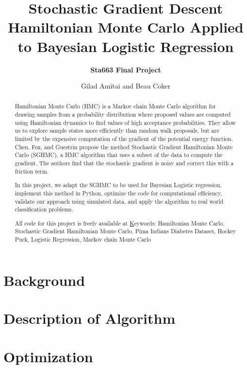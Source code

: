 \documentclass[12pt]{article}
\begin{document}
\vspace{-1in}
\author{\bf Sta663 Final Project}
\title{\bf Stochastic Gradient Descent Hamiltonian Monte Carlo Applied to Bayesian Logistic Regression}
\date{Gilad Amitai and Beau Coker}
\maketitle 


\begin{abstract}
	Hamiltonian Monte Carlo (HMC) is a Markov chain Monte Carlo algorithm for drawing samples from a probability distribution where proposed values are computed using Hamiltonian dynamics to find values of high acceptance probabilities. They allow us to explore sample states more efficiently than random walk proposals, but are limited by the expensive computation of the gradient of the potential energy function. Chen, Fox, and Guestrin propose the method Stochastic Gradient Hamiltonian Monte Carlo (SGHMC), a HMC algorithm that uses a subset of the data to compute the gradient. The authors find that the stochastic gradient is noisy and correct this with a friction term.

	In this project, we adapt the SGHMC to be used for Bayesian Logistic regression, implement this method in Python, optimize the code for computational efficiency, validate our approach using simulated data, and apply the algorithm to real world classification problems.
	
	All code for this project is freely available at \href{https://github.com/gldmt-duke/CokerAmitaiSGHMC}
	
	Keywords: Hamiltonian Monte Carlo, Stochastic Gradient Hamiltonian Monte Carlo, Pima Indians Diabetes Dataset, Hockey Puck, Logistic Regression, Markov chain Monte Carlo
\end{abstract}

\section{Background}


\section{Description of Algorithm}


\section{Optimization}

\end{document}
